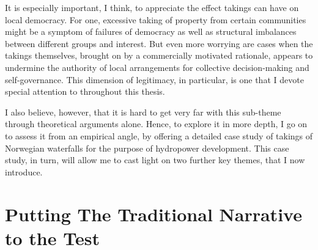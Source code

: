 {It is especially important, I think, to appreciate the effect takings can have on local democracy. For one, excessive taking of property from certain communities might be a symptom of failures of democracy as well as structural imbalances between different groups and interest. But even more worrying are cases when the takings themselves, brought on by a commercially motivated rationale, appears to undermine the authority of local arrangements for collective decision-making and self-governance. This dimension of legitimacy, in particular, is one that I devote special attention to throughout this thesis.

I also believe, however, that it is hard to get very far with this sub-theme through theoretical arguments alone. Hence, to explore it in more depth, I go on to assess it from an empirical angle, by offering a detailed case study of takings of Norwegian waterfalls for the purpose of hydropower development. This case study, in turn, will allow me to cast light on two further key themes, that I now introduce. %
}

\section{Putting The Traditional Narrative to the Test}

